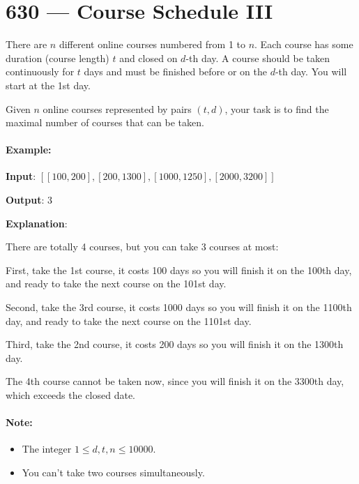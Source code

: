 \section{630 --- Course Schedule III}
There are $n$ different online courses numbered from 1 to $n$. Each course has some duration (course length) $t$ and closed on $d$-th day. A course should be taken continuously for $t$ days and must be finished before or on the $d$-th day. You will start at the 1st day.

Given $n$ online courses represented by pairs $(t,d)$, your task is to find the maximal number of courses that can be taken.

\paragraph{Example:}
\begin{flushleft}

\textbf{Input}: $[[100, 200], [200, 1300], [1000, 1250], [2000, 3200]]$

\textbf{Output}: 3

\textbf{Explanation}: 

There are totally 4 courses, but you can take 3 courses at most:

First, take the 1st course, it costs 100 days so you will finish it on the 100th day, and ready to take the next course on the 101st day.

Second, take the 3rd course, it costs 1000 days so you will finish it on the 1100th day, and ready to take the next course on the 1101st day. 

Third, take the 2nd course, it costs 200 days so you will finish it on the 1300th day.
 
The 4th course cannot be taken now, since you will finish it on the 3300th day, which exceeds the closed date.

\end{flushleft}

\paragraph{Note:}

\begin{itemize}
\item The integer $1 \leq d, t, n \leq 10000$.
\item You can't take two courses simultaneously.
\end{itemize}

